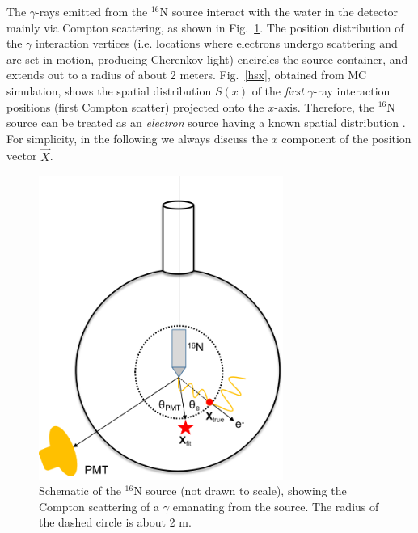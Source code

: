 The $\gamma$-rays emitted from the $^{16}$N source interact with the water in the detector mainly via Compton scattering, as shown in Fig.~\ref{N16centralDiagram}. The position distribution of the $\gamma$ interaction vertices (i.e. locations where electrons undergo scattering and are set in motion, producing Cherenkov light) encircles the source container, and extends out to a radius of about 2 meters. Fig.~\ref{hsx}, obtained from MC simulation, shows the spatial distribution $S(x)$ of the {\em first} $\gamma$-ray interaction positions (first Compton scatter) projected onto the $x$-axis. Therefore, the $^{16}$N source can be treated as an {\em electron} source having a known spatial distribution \cite{boulay2004direct}. For simplicity, in the following we always discuss the $x$ component of the position vector $\vec{X}$. 

\begin{figure}[!htb]
	\centering
	\includegraphics[width=8cm]{N16centralDiagram.png}
	\caption[Schematic of the $^{16}$N source.]{Schematic of the $^{16}$N source (not drawn to scale), showing the Compton scattering of a $\gamma$ emanating from the source. The radius of the dashed circle is about 2 m.	\label{N16centralDiagram}}
\end{figure}

